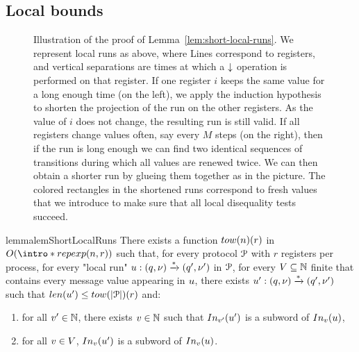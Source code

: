 \subsection{Local bounds}
\label{sec:local-bounds}


\begin{figure}
	
	\caption{Illustration of the proof of Lemma~\ref{lem:short-local-runs}. We represent local runs as above, where Lines correspond to registers, and vertical separations are times at which a $\downarrow$ operation is performed on that register. If one register $i$ keeps the same value for a long enough time (on the left), we apply the induction hypothesis to shorten the projection of the run on the other registers. As the value of $i$ does not change, the resulting run is still valid. If all registers change values often, say every $M$ steps (on the right), then if the run is long enough we can find two identical sequences of transitions during which all values are renewed twice. We can then obtain a shorter run by glueing them together as in the picture. The colored rectangles in the shortened runs correspond to fresh values that we introduce to make sure that all local disequality tests succeed.}
\end{figure}
\begin{restatable}{lemma}{lemShortLocalRuns}
	\label{lem:short-local-runs}
	There exists a function $\towerfun(n) (\regnum)$ in $O(\intro*\repexp{n}{\regnum})$ such that, for every protocol $\mathcal{P}$ with $r$ registers per process, for every "local run" $u: (q, \nu) \xrightarrow{*} (q', \nu')$ in $\mathcal{P}$, for every $V \subseteq \mathbb{N}$ finite that contains every message value appearing in $u$, there exists $u': (q, \nu) \xrightarrow{*} (q', \nu')$ such that $\length{\localrun'} \leq \towerfun(\size{\prot})(r)$ and:
	\begin{enumerate}
		\item \label{item:shorterrun_anyvalue} for all $v' \in \mathbb{N}$, there exists $v \in \mathbb{N}$ such that $\vinput{\aval'}{\localrun'}$ is a subword of $\vinput{\aval}{\localrun}$,
		\item \label{item:shorterrun_oldvalues} for all $v \in V$, $\vinput{\aval}{\localrun'}$ is a subword of $\vinput{\aval}{\localrun}$. 
	\end{enumerate}
\end{restatable}

